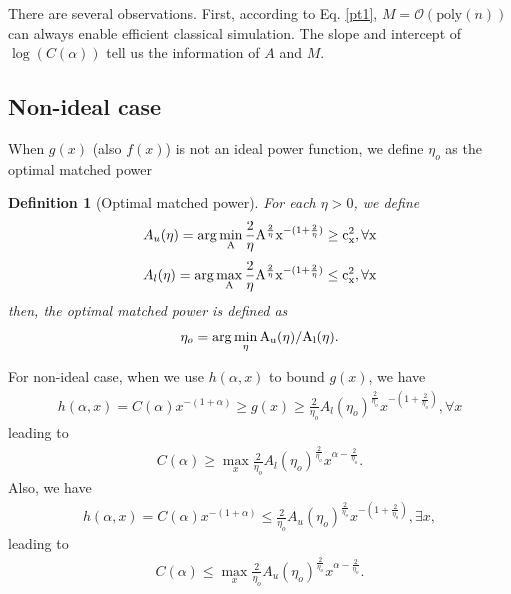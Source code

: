 \documentclass[showpacs,amsmath,amssymb,twocolumn,superscriptaddress,notitlepage,preprintnumbers,aps,pra,10pt,floatfix]{revtex4-2}
\newtheorem{definition}{Definition}
\begin{document}
\begin{appendix}
There are several observations. First, according to Eq. \ref{pt1}, $M=\mathcal{O}(\text{poly}(n))$ can always enable efficient classical simulation. The slope and intercept of $\log(C(\alpha))$ tell us the information of $A$ and $M$.

\subsection{Non-ideal case}
When $g(x)$ (also $f(x)$) is not an ideal power function, we define $\eta_o$ as the optimal matched power
\begin{definition}[Optimal matched power]
For each $\eta>0$, we define 
\begin{eqnarray}
A_u(\eta)=\rm{arg}\min_{A} \frac{2}{\eta}A^{\frac{2}{\eta}}x^{-(1+\frac{2}{\eta})}\geq c_x^2,\forall x
\end{eqnarray}
\begin{eqnarray}
A_l(\eta)=\rm{arg}\max_{A} \frac{2}{\eta}A^{\frac{2}{\eta}}x^{-(1+\frac{2}{\eta})}\leq c_x^2,\forall x
\end{eqnarray}
then, the optimal matched power is defined as
\begin{eqnarray}
\eta_o=\rm{arg}\min_{\eta} A_u(\eta)/A_l(\eta).
\end{eqnarray}
\end{definition}

For non-ideal case, when we use $h(\alpha,x)$ to bound $g(x)$, we have
\begin{eqnarray}
h(\alpha, x)=C(\alpha)x^{-(1+\alpha)}\geq g(x)\geq \frac{2}{\eta_o}A_l(\eta_o)^{\frac{2}{\eta_o}}x^{-(1+\frac{2}{\eta_o})},\forall x
\end{eqnarray}
leading to
\begin{eqnarray}
C(\alpha)\geq\max_x  \frac{2}{\eta_o}A_l(\eta_o)^{\frac{2}{\eta_o}} x^{\alpha-\frac{2}{\eta_o}}.
\end{eqnarray}
Also, we have 
\begin{eqnarray}
h(\alpha, x)=C(\alpha)x^{-(1+\alpha)}\leq \frac{2}{\eta_o}A_u(\eta_o)^{\frac{2}{\eta_o}}x^{-(1+\frac{2}{\eta_o})},\exists x,
\end{eqnarray}
leading to 
\begin{eqnarray}
C(\alpha)\leq\max_x  \frac{2}{\eta_o}A_u(\eta_o)^{\frac{2}{\eta_o}} x^{\alpha-\frac{2}{\eta_o}}.
\end{eqnarray}


\end{appendix}
\end{document}
